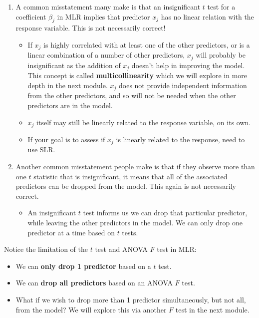 \documentclass[
]{book}
\providecommand{\tightlist}{%
  \setlength{\itemsep}{0pt}\setlength{\parskip}{0pt}}
\begin{document}
\begin{enumerate}
\def\labelenumi{\arabic{enumi}.}
\item
  A common misstatement many make is that an insignificant \(t\) test for a coefficient \(\beta_j\) in MLR implies that predictor \(x_j\) has no linear relation with the response variable. This is not necessarily correct!

  \begin{itemize}
  \item
    If \(x_j\) is highly correlated with at least one of the other predictors, or is a linear combination of a number of other predictors, \(x_j\) will probably be insignificant as the addition of \(x_j\) doesn't help in improving the model. This concept is called \textbf{multicollinearity} which we will explore in more depth in the next module. \(x_j\) does not provide independent information from the other predictors, and so will not be needed when the other predictors are in the model.
  \item
    \(x_j\) itself may still be linearly related to the response variable, on its own.
  \item
    If your goal is to assess if \(x_j\) is linearly related to the response, need to use SLR.
  \end{itemize}
\item
  Another common misstatement people make is that if they observe more than one \(t\) statistic that is insignificant, it means that all of the associated predictors can be dropped from the model. This again is not necessarily correct.

  \begin{itemize}
  \tightlist
  \item
    An insignificant \(t\) test informs us we can drop that particular predictor, while leaving the other predictors in the model. We can only drop one predictor at a time based on \(t\) tests.
  \end{itemize}
\end{enumerate}

Notice the limitation of the \(t\) test and ANOVA \(F\) test in MLR:

\begin{itemize}
\tightlist
\item
  We can \textbf{only drop 1 predictor} based on a \(t\) test.
\item
  We can \textbf{drop all predictors} based on an ANOVA \(F\) test.
\item
  What if we wish to drop more than 1 predictor simultaneously, but not all, from the model? We will explore this via another \(F\) test in the next module.
\end{itemize}
\end{document}
